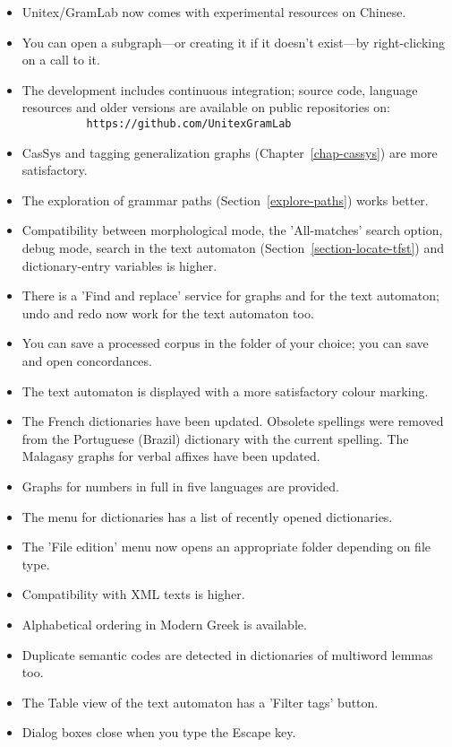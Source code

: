 \begin{itemize}
  \item Unitex/GramLab now comes with experimental resources on Chinese.
  \item You can open a subgraph---or creating it if it doesn't exist---by
  right-clicking on a call to it.
  \item The development includes continuous integration; source code, language
  resources and older versions are available on public repositories on:\\
  \verb$          https://github.com/UnitexGramLab$
  \item CasSys and tagging generalization graphs (Chapter~\ref{chap-cassys}) are more satisfactory.
  \item The exploration of grammar paths (Section~\ref{explore-paths}) works better.
  \item Compatibility between morphological mode, the 'All-matches' search option,
  debug mode, search in the text automaton (Section~\ref{section-locate-tfst}) and
  dictionary-entry variables is higher.
  \item There is a 'Find and replace' service for graphs and for the text automaton;
  undo and redo now work for the text automaton too.
  \item You can save a processed corpus in the folder of your choice; you can save
  and open concordances.
  \item The text automaton is displayed with a more satisfactory colour marking.
  \item The French dictionaries have been updated. Obsolete spellings were removed
  from the Portuguese (Brazil) dictionary with the current spelling. The Malagasy
  graphs for verbal affixes have been updated.
  \item Graphs for numbers in full in five languages are provided.
  \item The menu for dictionaries has a list of recently opened dictionaries.
  \item The 'File edition' menu now opens an appropriate folder depending on file type.
  \item Compatibility with XML texts is higher.
  \item Alphabetical ordering in Modern Greek is available.
  \item Duplicate semantic codes are detected in dictionaries of multiword
  lemmas too.
  \item The Table view of the text automaton has a 'Filter tags' button.
  \item Dialog boxes close when you type the Escape key.

\end{itemize}
